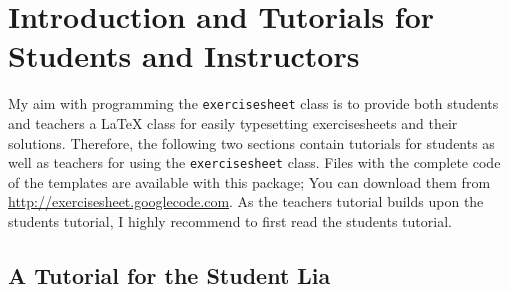 \documentclass{report}
\def\exercisesheet{\texttt{exercisesheet}}
\begin{document}

\begin{abstract}
  The \exercisesheet{} class provides a convenient way to produce
  hiqh-quality exercise sheets for both students and instructors. This
  is the official reference manual. It contains tutorials for students
  and instructors that explain the first steps in using this class.
  Moreover, a complete list of the commands defined by the
  \exercisesheet{} class is contained.
\end{abstract}

\tableofcontents

\chapter{Introduction and Tutorials for Students and Instructors}

My aim with programming the \exercisesheet{} class is to provide both
students and teachers a \LaTeX{} class for easily typesetting
exercisesheets and their solutions. Therefore, the following two
sections contain tutorials for students as well as teachers for using
the \exercisesheet{} class. Files with the complete code of the
templates are available with this package; You can download them from
\url{http://exercisesheet.googlecode.com}. As the teachers tutorial
builds upon the students tutorial, I highly recommend to first read
the students tutorial.

\section{A Tutorial for the Student Lia}
\end{document}
